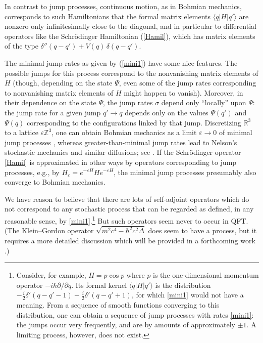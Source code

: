 \documentclass[12pt]{article}
\newcommand{\RRR}{\mathbb{R}} %
\newcommand{\ZZZ}{\mathbb{Z}} %
\newcommand{\E}{e} %
\newcommand{\I}{i} %
\newcommand{\1}{\mathbf{1}} %
\newcommand{\Laplace}{\Delta} %
\renewcommand{\sp}[2]{\langle #1 | #2 \rangle} %
\begin{document}
In contrast to jump processes, continuous motion, as in Bohmian
mechanics, corresponds to such Hamiltonians that the formal matrix
elements $\sp{q}{H|q'}$ are nonzero only infinitesimally close to the
diagonal, and in particular to differential operators like the
Schr\"odinger Hamiltonian (\ref{Hamil}), which has matrix elements of
the type $\delta''(q-q') + V(q) \,\delta(q-q')$.

The minimal jump rates as given by (\ref{mini1}) have some nice
features.  The possible jumps for this process correspond to the
nonvanishing matrix elements of $H$ (though, depending on the state
$\Psi$, even some of the jump rates corresponding to nonvanishing
matrix elements of $H$ might happen to vanish).  Moreover, in their
dependence on the state $\Psi$, the jump rates $\sigma$ depend only
``locally'' upon $\Psi$: the jump rate for a given jump $q'\to q$
depends only on the values $\Psi(q')$ and $\Psi(q)$ corresponding to
the configurations linked by that jump.  Discretizing $\RRR^3$ to a
lattice $\varepsilon \ZZZ^3$, one can obtain Bohmian mechanics as a
limit $\varepsilon\to 0$ of minimal jump processes
\cite{Sudbery,Vink}, whereas greater-than-minimal jump rates lead to
Nelson's stochastic mechanics \cite{stochmech} and similar diffusions;
see \cite{Vink,Guerra}. If the Schr\"odinger operator \eqref{Hamil} is
approximated in other ways by operators corresponding to jump
processes, e.g., by $H_\varepsilon = \E^{-\varepsilon H} H
\E^{-\varepsilon H}$, the minimal jump processes presumably also
converge to Bohmian mechanics.

We have reason to believe that there are lots of self-adjoint
operators which do not correspond to any stochastic process that can
be regarded as defined, in any reasonable sense, by
\eqref{mini1}.\footnote{Consider, for example, $H = p \cos p$ where
$p$ is the one-dimensional momentum operator $-\I\hbar
\partial/\partial q$. Its formal kernel $\sp{q}{H|q'}$ is the
distribution $-\frac{\I}{2} \delta'(q-q'-1) - \frac{\I}{2}
\delta'(q-q'+1)$, for which \eqref{mini1} would not have a meaning.
{}From a sequence of smooth functions converging to this distribution,
one can obtain a sequence of jump processes with rates \eqref{mini1}:
the jumps occur very frequently, and are by amounts of approximately
$\pm 1$.  A limiting process, however, does not exist.}  But such
operators seem never to occur in QFT. (The Klein--Gordon operator
$\sqrt{m^2 c^4 - \hbar^2 c^2 \Laplace}$ does seem to have a process,
but it requires a more detailed discussion which will be provided in a
forthcoming work \cite{klein2}.)
\end{document}
